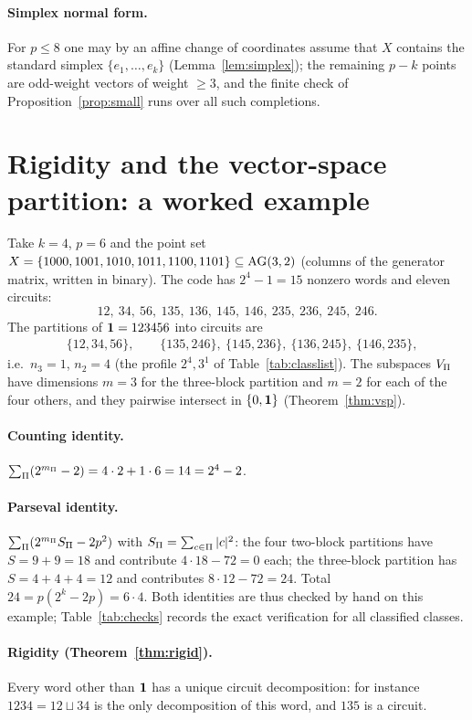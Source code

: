 \paragraph{Simplex normal form.} For $p\le8$ one may by an affine change of coordinates assume that $X$ contains the standard simplex $\{e_1,\dots,e_k\}$ (Lemma~\ref{lem:simplex}); the remaining $p-k$ points are odd-weight vectors of weight $\ge3$, and the finite check of Proposition~\ref{prop:small} runs over all such completions.

\section{Rigidity and the vector-space partition: a worked example}\label{app:G}

Take $k=4$, $p=6$ and the point set $X=\{1000,1001,1010,1011,1100,1101\}\subseteq\mathrm{AG}(3,2)$ (columns of the generator matrix, written in binary). The code has $2^4-1=15$ nonzero words and eleven circuits:
\[
12,\ 34,\ 56,\ 135,\ 136,\ 145,\ 146,\ 235,\ 236,\ 245,\ 246 .
\]
The partitions of $\mathbf 1=123456$ into circuits are
\begin{align*}
&\{12,34,56\},\qquad \{135,246\},\ \{145,236\},\ \{136,245\},\ \{146,235\},
\end{align*}
i.e.\ $n_3=1$, $n_2=4$ (the profile $2^4,3^1$ of Table~\ref{tab:classlist}). The subspaces $V_\Pi$ have dimensions $m=3$ for the three-block partition and $m=2$ for each of the four others, and they pairwise intersect in $\{0,\mathbf 1\}$ (Theorem~\ref{thm:vsp}).

\paragraph{Counting identity.} $\sum_\Pi(2^{m_\Pi}-2)=4\cdot2+1\cdot6=14=2^4-2$.

\paragraph{Parseval identity.} $\sum_\Pi(2^{m_\Pi}S_\Pi-2p^2)$ with $S_\Pi=\sum_{c\in\Pi}|c|^2$: the four two-block partitions have $S=9+9=18$ and contribute $4\cdot18-72=0$ each; the three-block partition has $S=4+4+4=12$ and contributes $8\cdot12-72=24$. Total $24=p(2^k-2p)=6\cdot4$. Both identities are thus checked by hand on this example; Table~\ref{tab:checks} records the exact verification for all classified classes.

\paragraph{Rigidity (Theorem~\ref{thm:rigid}).} Every word other than $\mathbf 1$ has a unique circuit decomposition: for instance $1234=12\sqcup34$ is the only decomposition of this word, and $135$ is a circuit.

